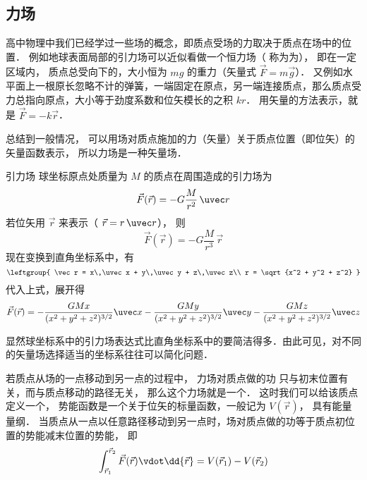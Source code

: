 

\subsection{力场}
高中物理中我们已经学过一些场的概念，即质点受场的力取决于质点在场中的位置． 例如地球表面局部的引力场可以近似看做一个恒力场（ 称为为）， 即在一定区域内， 质点总受向下的，大小恒为 $mg$ 的重力（矢量式 $\vec F = m\vec g$）． 又例如水平面上一根原长忽略不计的弹簧，一端固定在原点，另一端连接质点，那么质点受力总指向原点，大小等于劲度系数和位矢模长的之积 $kr$． 用矢量的方法表示，就是 $\vec F = -k\vec r$．

总结到一般情况， 可以用场对质点施加的力（矢量）关于质点位置（即位矢）的矢量函数表示， 所以力场是一种矢量场．


\begin{exam}{引力场}\label{V_ex1}
球坐标原点处质量为 $M$ 的质点在周围造成的引力场为
\begin{equation}
\vec F(\vec r) =  - G\frac{M}{r^2}\,\uvec r
\end{equation} 
若位矢用 $\vec r$ 来表示（ $\vec r = r\,\uvec r$）， 则
\begin{equation}
\vec F(\vec r) =  - G\frac{M}{r^3}\,\vec r
\end{equation}
现在变换到直角坐标系中，有
\begin{equation}
\leftgroup{
\vec r = x\,\uvec x + y\,\uvec y + z\,\uvec z\\
r = \sqrt{x^2 + y^2 + z^2} 
}\end{equation} 
代入上式，展开得
\begin{equation}
\vec F(\vec r) =  - \frac{GMx}{(x^2+y^2+z^2)^{3/2}}\uvec x - \frac{GMy}{(x^2 +y^2+z^2)^{3/2}}\uvec y - \frac{GMz}{(x^2+y^2+z^2)^{3/2}}\uvec z 
\end{equation} 

显然球坐标系中的引力场表达式比直角坐标系中的要简洁得多．由此可见，对不同的矢量场选择适当的坐标系往往可以简化问题．
\end{exam}

若质点从场的一点移动到另一点的过程中， 力场对质点做的功 只与初末位置有关，而与质点移动的路径无关， 那么这个力场就是一个． 这时我们可以给该质点定义一个， 势能函数是一个关于位矢的标量函数，一般记为 $V(\vec r)$， 具有能量量纲． 当质点从一点以任意路径移动到另一点时，场对质点做的功等于质点初位置的势能减末位置的势能， 即
\begin{equation}\label{V_eq1}
\int_{\vec r_1}^{\vec r_2} \vec F(\vec r) \vdot \dd{\vec r} = V(\vec r_1)-V(\vec r_2)
\end{equation}

